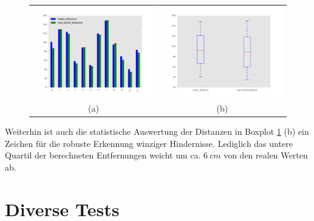 	\begin{figure}[h]
		\centering
		\begin{tabular}{cc}
		\includegraphics[width=7cm]{img/evaluation/sample_tiny_bar}&
		\includegraphics[width=7cm]{img/evaluation/sample_tiny_box}\\
		 (a) & (b)
		\end{tabular}
		\caption{}
	    \label{fig:sample_eval_tiny}
	\end{figure}
	
	\noindent
	Weiterhin ist auch die statistische Auswertung der Distanzen in Boxplot \ref{fig:sample_eval_tiny} (b) ein Zeichen für die robuste Erkennung winziger Hindernisse. Lediglich das untere Quartil der berechneten Entfernungen weicht um ca. $6\ cm$ von den realen Werten ab.

\section{Diverse Tests}
\label{sec:further_tests}

	

